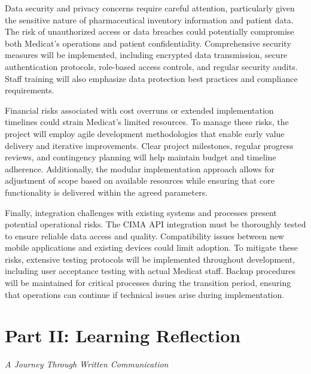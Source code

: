 \documentclass[
]{report}
\begin{document}
Data security and privacy concerns require careful attention,
particularly given the sensitive nature of pharmaceutical inventory
information and patient data. The risk of unauthorized access or data
breaches could potentially compromise both Medicat's operations and
patient confidentiality. Comprehensive security measures will be
implemented, including encrypted data transmission, secure
authentication protocols, role-based access controls, and regular
security audits. Staff training will also emphasize data protection best
practices and compliance requirements.

Financial risks associated with cost overruns or extended implementation
timelines could strain Medicat's limited resources. To manage these
risks, the project will employ agile development methodologies that
enable early value delivery and iterative improvements. Clear project
milestones, regular progress reviews, and contingency planning will help
maintain budget and timeline adherence. Additionally, the modular
implementation approach allows for adjustment of scope based on
available resources while ensuring that core functionality is delivered
within the agreed parameters.

Finally, integration challenges with existing systems and processes
present potential operational risks. The CIMA API integration must be
thoroughly tested to ensure reliable data access and quality.
Compatibility issues between new mobile applications and existing
devices could limit adoption. To mitigate these risks, extensive testing
protocols will be implemented throughout development, including user
acceptance testing with actual Medicat staff. Backup procedures will be
maintained for critical processes during the transition period, ensuring
that operations can continue if technical issues arise during
implementation.

\chapter{Part II: Learning
Reflection}\label{part-ii-learning-reflection}

\emph{A Journey Through Written Communication}
\end{document}
